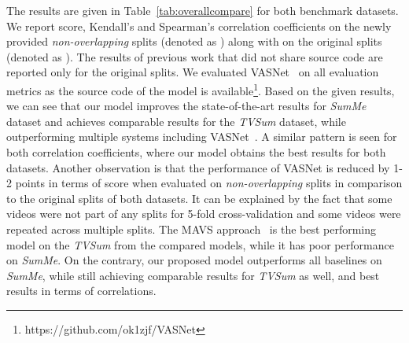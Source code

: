 \documentclass{article}
\begin{document}
The results are given in  Table~\ref{tab:overallcompare} for both benchmark datasets. We report  score, Kendall’s  and Spearman’s  correlation coefficients on the newly provided \textit{non-overlapping} splits (denoted as ) along with  on the original splits (denoted as ). The results of previous work that did not share source code are reported only for the original splits. We evaluated VASNet~\cite{DBLP:conf/accv/FajtlSAMR18} on all evaluation metrics as the source code of the model is available\footnote{https://github.com/ok1zjf/VASNet}. Based on the given results, we can see that our model improves the state-of-the-art results for \emph{SumMe} dataset and achieves comparable results for the \emph{TVSum} dataset, while outperforming multiple systems including VASNet~\cite{DBLP:conf/accv/FajtlSAMR18}. A similar pattern is seen for both correlation coefficients, where our model obtains the best results for both datasets. Another observation is that the performance of VASNet is reduced by 1-2 points in terms of  score when evaluated on \textit{non-overlapping} splits in comparison to the original splits of both datasets. It can be explained by the fact that some videos were not part of any splits for 5-fold cross-validation and some videos were repeated across multiple splits. The MAVS approach~\cite{DBLP:conf/mm/FengLKZ18} is the best performing model on the \emph{TVSum} from the compared models, while it has poor performance on \emph{SumMe}. On the contrary, our proposed model outperforms all baselines on \emph{SumMe}, while still achieving comparable results for \emph{TVSum} as well, and best results in terms of correlations.
\end{document}
